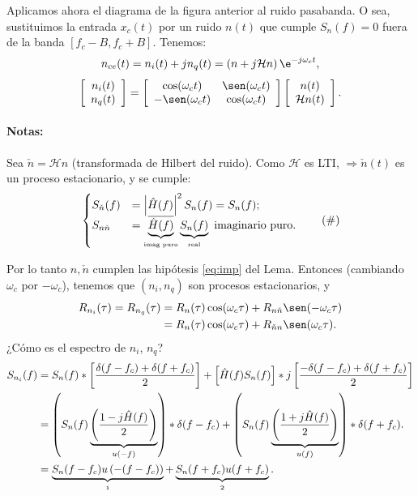 Aplicamos ahora el diagrama de la figura anterior al ruido pasabanda. O sea, sustituimos la
entrada $x_c(t)$ por un ruido $n(t)$ que cumple $S_n(f)=0$ fuera de la
banda $[f_c-B,f_c+B]$. Tenemos: 
\[
n_{ce}(t)=n_i(t)+jn_q(t) = \left(n + j\mathcal{H}n\right)
\e^{-j\omega_ct},\]
\begin{equation*}
    \left[\begin{array}{c}
            n_i(t)\\
            n_q(t)
          \end{array}\right]
    = \left[\begin{array}{cc}
                \cos(\omega_ct) & \sen(\omega_ct)\\
                -\sen(\omega_ct) & \cos(\omega_ct)
            \end{array}\right]
    \left[\begin{array}{c}
            n(t)\\
            \mathcal{H}n(t)
          \end{array}\right].
\end{equation*}

\paragraph{Notas:} Sea $\check{n}=\mathcal{H}n$ (transformada de Hilbert del ruido).
Como $\mathcal{H}$ es LTI, $\Rightarrow \check{n}(t)$ es un
proceso estacionario, y se cumple:
\[\begin{cases} S_{\check{n}}(f)& =\left|\hat{H}(f)\right|^2S_n(f)=S_n(f);\\
                S_{n\check{n}} &= \underbrace{\overline{\hat{H}(f)}}_{\text{\tiny imag puro}}\underbrace{S_n(f)}_{\text{\tiny  real}}    
    \text{  imaginario
                puro}.
              \end{cases}\tag{\#}\]


Por lo tanto $n, \check{n}$ cumplen las hipótesis \eqref{eq:imp} del
Lema. Entonces (cambiando $\omega_c$ por $-\omega_c$), tenemos que
$(n_i,n_q)$ son procesos estacionarios, y
\begin{align*}
    R_{n_i}(\tau)=R_{n_q}(\tau) & = R_n(\tau)\cos(\omega_c\tau)+R_{n\check{n}}\sen(-\omega_c\tau)\\
                    & = R_{n}(\tau)\cos(\omega_c\tau) +
                    R_{\check{n}n}\sen(\omega_c\tau).
\end{align*}
¿Cómo es el espectro de $n_i$, $n_q$?
\begin{align*}
    S_{n_i}(f)  & = S_n(f) \ast \left[\frac{\delta(f-f_c)+\delta(f+f_c)}{2}\right] +
              \left[\hat{H}(f)S_n(f)\right]\ast j\left[\frac{-\delta(f-f_c)+\delta(f+f_c)}{2}\right]\\
            & = \left(S_n(f)\underbrace{\left(\frac{1-j\hat{H}(f)}{2}\right)}_{u(-f)}\right)\ast\delta(f-f_c)+
            \left(S_n(f)\underbrace{\left(\frac{1+j\hat{H}(f)}{2}\right)}_{u(f)}\right)\ast\delta(f+f_c).\\
& = \underbrace{S_n(f-f_c)u\left(-(f-f_c)\right)}_{\oldstylenums{1}}+
    \underbrace{S_n(f+f_c)u(f+f_c)}_{\oldstylenums{2}}.
\end{align*}

